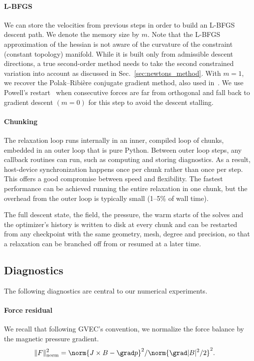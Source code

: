 \documentclass[%
 reprint,
 superscriptaddress,
 amsmath,amssymb,
 aps, nofootinbib, floatfix]{revtex4-2}
\begin{document}
\paragraph{L-BFGS}
We can store the velocities from previous steps in order to build an L-BFGS descent path. We denote the memory size by $m$. Note that the L-BFGS approximation of the hessian is not aware of the curvature of the constraint (constant topology) manifold. While it is built only from admissible descent directions, a true second-order method needs to take the second constrained variation into account as discussed in Sec.~\ref{sec:newtons_method}. With $m=1$, we recover the Polak--Ribi\`ere conjugate gradient method, also used in~\cite{chodura_3d_1981}. We use Powell's restart~\cite{powell_restart_1977} when consecutive forces are far from orthogonal and fall back to gradient descent $(m=0)$ for this step to avoid the descent stalling.   

\paragraph{Chunking}
The relaxation loop runs internally in an inner, compiled loop of chunks, embedded in an outer loop that is pure Python. Between outer loop steps, any callback routines can run, such as computing and storing diagnostics. As a result, host-device synchronization happens once per chunk rather than once per step. This offers a good compromise between speed and flexibility. The fastest performance can be achieved running the entire relaxation in one chunk, but the overhead from the outer loop is typically small (1--5\% of wall time). 

The full descent state, the field, the pressure, the warm starts of the solves and the optimizer's history is written to disk at every chunk and can be restarted from any checkpoint with the same geometry, mesh, degree and precision, so that a relaxation can be branched off from or resumed at a later time.   

\subsection{Diagnostics}
\label{sec:diagnostics}

The following diagnostics are central to our numerical experiments.

\paragraph{Force residual}
We recall that following GVEC's convention, we normalize the force balance by the magnetic pressure gradient.
\begin{align}
\label{eq:force_residual_normalized}
    \| F \|^2_{\mathrm{norm}} &= \norm{J \times B - \grad p}^2 / \norm{\grad |B|^2 / 2}^2. \notag
\end{align}
\end{document}
